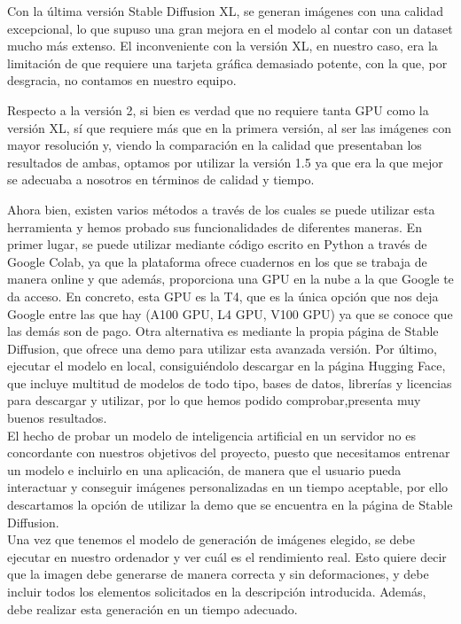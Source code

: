 Con la última versión Stable Diffusion XL, se generan imágenes con una calidad excepcional, lo que supuso una gran mejora en el modelo al contar con un dataset mucho más extenso. El inconveniente con la versión XL, en nuestro caso, era la limitación de que requiere una tarjeta gráfica demasiado potente, con la que, por desgracia, no contamos en nuestro equipo. 

Respecto a la versión 2, si bien es verdad que no requiere tanta GPU como la versión XL, sí que requiere más que en la primera versión, al ser las imágenes con mayor resolución y, viendo la comparación en la calidad que presentaban los resultados de ambas, optamos por utilizar la versión 1.5 ya que era la que mejor se adecuaba a nosotros en términos de calidad y tiempo.


Ahora bien, existen varios métodos a través de los cuales se puede utilizar esta herramienta y hemos probado sus funcionalidades de diferentes maneras. En primer lugar, se puede utilizar mediante código escrito en Python a través de Google Colab, ya que la plataforma ofrece cuadernos en los que se trabaja de manera online y que además, proporciona una GPU en la nube a la que Google te da acceso. En concreto, esta GPU es la T4, que es la única opción que nos deja Google entre las que hay (A100 GPU, L4 GPU, V100 GPU) ya que se conoce que las demás son de pago. Otra alternativa es mediante la propia página de Stable Diffusion, que ofrece una demo para utilizar esta avanzada versión. Por último, ejecutar el modelo en local, consiguiéndolo descargar en la página Hugging Face, que incluye multitud de modelos de todo tipo, bases de datos, librerías y licencias para descargar y utilizar, por lo que hemos podido comprobar,presenta muy buenos resultados.\\

El hecho de probar un modelo de inteligencia artificial en un servidor no es concordante con nuestros objetivos del proyecto, puesto que necesitamos entrenar un modelo e incluirlo en una aplicación, de manera que el usuario pueda interactuar y conseguir imágenes personalizadas en un tiempo aceptable, por ello descartamos la opción de utilizar la demo que se encuentra en la página de Stable Diffusion. \\

Una vez que tenemos el modelo de generación de imágenes elegido, se debe ejecutar en nuestro ordenador y ver cuál es el rendimiento real. Esto quiere decir que la imagen debe generarse de manera correcta y sin deformaciones, y debe incluir todos los elementos solicitados en la descripción introducida. Además, debe realizar esta generación en un tiempo adecuado.\\

